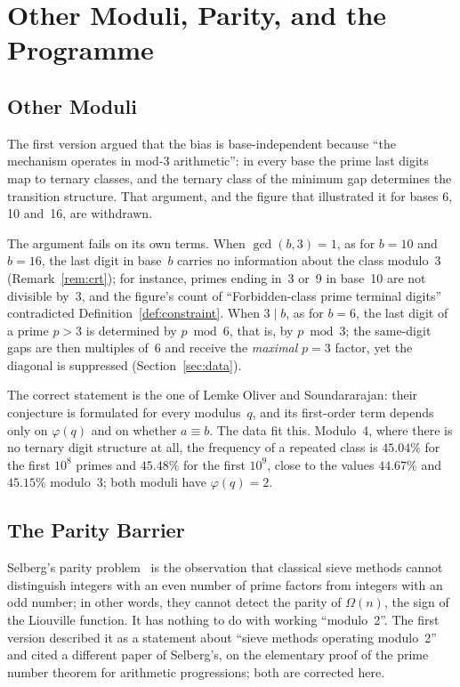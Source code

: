 \documentclass[12pt,a4paper]{article}
\theoremstyle{plain}
\theoremstyle{definition}
\theoremstyle{remark}
\begin{document}
\section{Other Moduli, Parity, and the Programme}
\label{sec:validation}

\subsection{Other Moduli}
\label{sec:bases}

\begin{erratumbox}
\noindent The first version argued that the bias is base-independent because ``the
mechanism operates in mod-3 arithmetic'': in every base the prime last digits map to
ternary classes, and the ternary class of the minimum gap determines the transition
structure. That argument, and the figure that illustrated it for bases 6, 10 and~16, are
withdrawn.
\end{erratumbox}

The argument fails on its own terms. When $\gcd(b, 3) = 1$, as for $b = 10$ and
$b = 16$, the last digit in base~$b$ carries no information about the class modulo~3
(Remark~\ref{rem:crt}); for instance, primes ending in~3 or~9 in base~10 are not
divisible by~3, and the figure's count of ``Forbidden-class prime terminal digits''
contradicted Definition~\ref{def:constraint}. When $3 \mid b$, as for $b = 6$, the last
digit of a prime $p > 3$ is determined by $p \bmod 6$, that is, by $p \bmod 3$; the
same-digit gaps are then multiples of~6 and receive the \emph{maximal} $p = 3$ factor,
yet the diagonal is suppressed (Section~\ref{sec:data}).

The correct statement is the one of Lemke Oliver and Soundararajan: their conjecture is
formulated for every modulus~$q$, and its first-order term depends only on $\varphi(q)$
and on whether $a \equiv b$. The data fit this. Modulo~4, where there is no ternary digit
structure at all, the frequency of a repeated class is $45.04\%$ for the first $10^8$
primes and $45.48\%$ for the first $10^9$, close to the values $44.67\%$ and $45.15\%$
modulo~3; both moduli have $\varphi(q) = 2$.

\subsection{The Parity Barrier}

Selberg's parity problem~\cite{Sel49} is the observation that classical sieve methods
cannot distinguish integers with an even number of prime factors from integers with an
odd number; in other words, they cannot detect the parity of $\Omega(n)$, the sign of
the Liouville function. It has nothing to do with working ``modulo~2''. The first version
described it as a statement about ``sieve methods operating modulo~2'' and cited a
different paper of Selberg's, on the elementary proof of the prime number theorem for
arithmetic progressions; both are corrected here.
\end{document}
